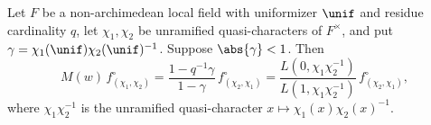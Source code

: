 Let $F$ be a non-archimedean local field with uniformizer $\unif$ and residue cardinality $q$, let $\chi_1,\chi_2$ be
unramified quasi-characters of $F^\times$, and put $\gamma=\chi_1(\unif)\chi_2(\unif)^{-1}$. Suppose $\abs{\gamma}<1$.
Then
\[
  M(w)\,f^\circ_{(\chi_1,\chi_2)}=\frac{1-q^{-1}\gamma}{1-\gamma}\,f^\circ_{(\chi_2,\chi_1)}
  =\frac{L(0,\chi_1\chi_2^{-1})}{L(1,\chi_1\chi_2^{-1})}\,f^\circ_{(\chi_2,\chi_1)},
\]
where $\chi_1\chi_2^{-1}$ is the unramified quasi-character $x\mapsto\chi_1(x)\chi_2(x)^{-1}$.

